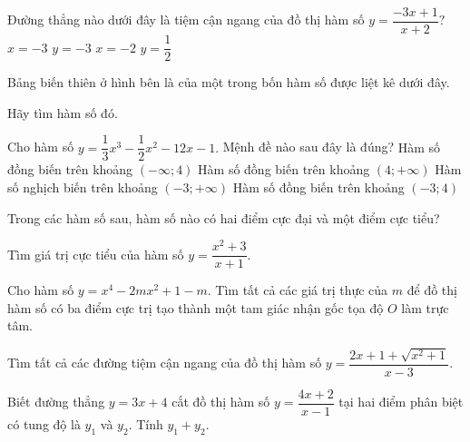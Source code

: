 \begin{ex}%
Đường thẳng nào dưới đây là tiệm cận ngang của đồ thị hàm số $y=\dfrac{-3x+1}{x+2}?$
\choice
{$x=-3$}
{\True $y=-3$}
{$x=-2$}
{$y=\dfrac{1}{2}$}
\end{ex}

\begin{ex}%
Bảng biến thiên ở hình bên là của một trong bốn hàm số được liệt kê dưới đây.
\begin{center}
\end{center} Hãy tìm hàm số đó.
\end{ex}
\begin{ex}%
Cho hàm số $y=\dfrac{1}{3}x^3-\dfrac{1}{2}x^2-12x-1.$ Mệnh đề nào sau đây là đúng?
\choice
{Hàm số đồng biến trên khoảng $(-\infty;4)$}
{\True Hàm số đồng biến trên khoảng $(4;+\infty)$}
{Hàm số nghịch biến trên khoảng $(-3;+\infty)$}
{Hàm số đồng biến trên khoảng $(-3;4)$}
\end{ex}
\begin{ex}%
Trong các hàm số sau, hàm số nào có hai điểm cực đại và một điểm cực tiểu?
\end{ex}
\begin{ex}%
Tìm giá trị cực tiểu của hàm số $y=\dfrac{x^2+3}{x+1}.$
\end{ex}
\begin{ex}%
Cho hàm số $y=x^4-2mx^2+1-m.$ Tìm tất cả các giá trị thực của $m$ để đồ thị hàm số có ba điểm cực trị tạo thành một tam giác nhận gốc tọa độ $O$ làm trực tâm.
\end{ex}
\begin{ex}%
Tìm tất cả các đường tiệm cận ngang của đồ thị hàm số $y=\dfrac{2x+1+\sqrt{x^2+1}}{x-3}.$
\end{ex}
\begin{ex}%
Biết đường thẳng $y=3x+4$ cắt đồ thị hàm số $y=\dfrac{4x+2}{x-1}$ tại hai điểm phân biệt có tung độ là $y_1$ và $y_2$. Tính $y_1+y_2.$
\end{ex}
